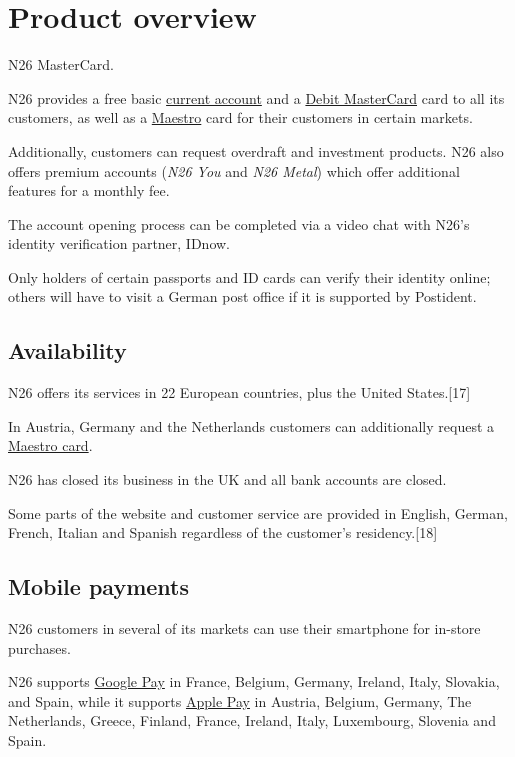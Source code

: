 \documentclass[onsided]{book}
\numberwithin{equation}{section}
\begin{document}
\section{Product overview}
\textsf{N26 MasterCard}.

N26 provides a free basic \href{https://en.wikipedia.org/wiki/Transaction_account}{current account} and a \href{https://en.wikipedia.org/wiki/Debit_MasterCard}{Debit MasterCard} card to all its customers, as well as a \href{https://en.wikipedia.org/wiki/Maestro_(debit_card)}{Maestro} card for their customers in certain markets.

Additionally, customers can request overdraft and investment products. N26 also offers premium accounts (\textit{N26 You} and \textit{N26 Metal}) which offer additional features for a monthly fee.

%
The account opening process can be completed via a video chat with N26's identity verification partner, IDnow.

Only holders of certain passports and ID cards can verify their identity online; others will have to visit a German post office if it is supported by Postident.

\subsection{Availability}
N26 offers its services in 22 European countries, plus the United States.[17]

In Austria, Germany and the Netherlands customers can additionally request a \href{https://en.wikipedia.org/wiki/Maestro_card}{Maestro card}.

N26 has closed its business in the UK and all bank accounts are closed.

%
Some parts of the website and customer service are provided in English, German, French, Italian and Spanish regardless of the customer's residency.[18]

\subsection{Mobile payments}
N26 customers in several of its markets can use their smartphone for in-store purchases.

N26 supports \href{https://en.wikipedia.org/wiki/Google_Pay}{Google Pay} in France, Belgium, Germany, Ireland, Italy, Slovakia, and Spain, while it supports \href{https://en.wikipedia.org/wiki/Apple_Pay}{Apple Pay} in Austria, Belgium, Germany, The Netherlands, Greece, Finland, France, Ireland, Italy, Luxembourg, Slovenia and Spain.
\end{document}
